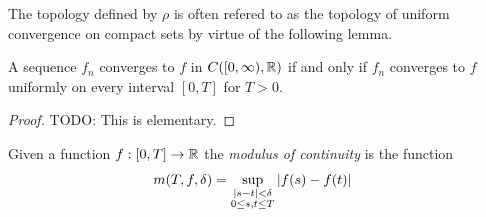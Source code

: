 The topology defined by $\rho$ is often refered to as the topology of
uniform convergence on compact sets by virtue of the following lemma.
\begin{lem}\label{UniformConvergenceOnCompacts}A sequence $f_n$
  converges to $f$ in $C([0,\infty), \mathbb{R})$ if and only if
  $f_n$ converges to $f$ uniformly on every interval $[0,T]$ for $T > 0$.
\end{lem}
\begin{proof}
TODO:  This is elementary.
\end{proof}

\begin{defn}Given a function $f : [0,T] \to \mathbb{R}$ the \emph{modulus
    of continuity} is the function
\begin{align*}
m(T, f, \delta) &= \sup_{\substack{\left \vert s - t \right \vert < \delta \\
0 \leq s,t \leq T}} \left \vert f(s) - f(t) \right \vert
\end{align*}
\end{defn}

